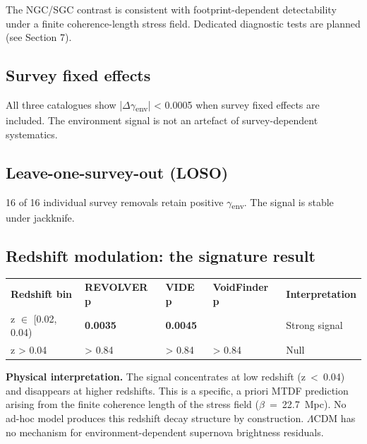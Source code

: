 \documentclass[11pt,a4paper]{article}
\begin{document}
The NGC/\allowbreak{}SGC contrast is consistent with footprint-dependent detectability under a finite coherence-length stress field. Dedicated diagnostic tests are planned (see Section 7).

\subsection{Survey fixed effects}
All three catalogues show |$\Delta$$\gamma$\textsubscript{env}| < 0.0005 when survey fixed effects are included. The environment signal is not an artefact of survey-dependent systematics.

\subsection{Leave-one-survey-out (LOSO)}
16 of 16 individual survey removals retain positive $\gamma$\textsubscript{env}. The signal is stable under jackknife.

\subsection{Redshift modulation: the signature result}
\begin{table}[H]
\centering
\footnotesize
\begin{tabularx}{\linewidth}{l>{\RaggedRight\arraybackslash}X>{\RaggedRight\arraybackslash}X>{\RaggedRight\arraybackslash}X>{\RaggedRight\arraybackslash}X}
\toprule
\textbf{Redshift bin} & \textbf{REVOLVER p} & \textbf{VIDE p} & \textbf{VoidFinder p} & \textbf{Interpretation} \tabularnewline
z $\in$ [0.02, 0.04) & \textbf{0.0035} & \textbf{0.0045} & 0.06 & Strong signal \tabularnewline
z > 0.04 & > 0.84 & > 0.84 & > 0.84 & Null \tabularnewline
\bottomrule
\end{tabularx}
\end{table}

\begin{mdframed}[linecolor=accent,linewidth=0.5pt,backgroundcolor=callout-bg,leftline=true,rightline=true,topline=true,bottomline=true,innerleftmargin=8pt,innerrightmargin=8pt,innertopmargin=6pt,innerbottommargin=6pt]
\textbf{Physical interpretation.}
The signal concentrates at low redshift (z~<~0.04) and disappears at higher redshifts. This is a specific, a priori MTDF prediction arising from the finite coherence length of the stress field ($\beta$~=~22.7~Mpc). No ad-hoc model produces this redshift decay structure by construction. $\Lambda$CDM has no mechanism for environment-dependent supernova brightness residuals.
\end{mdframed}
\end{document}
